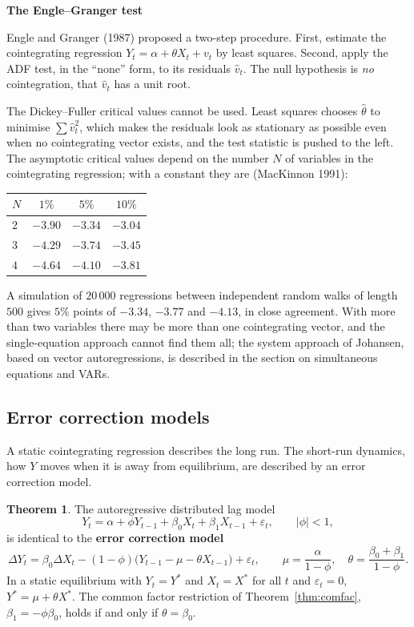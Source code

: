 \documentclass[11pt,a4paper]{article}
\numberwithin{equation}{section}
\theoremstyle{definition}
\newtheorem{thm}{Theorem}[subsection]
\newcommand{\subhead}[1]{%
  \par\medskip\noindent\textbf{#1}\par\nobreak\smallskip}
\begin{document}
\subhead{The Engle--Granger test}
Engle and Granger (1987) proposed a two-step procedure. First, estimate the cointegrating regression $Y_t = \alpha + \theta X_t + v_t$ by least squares. Second, apply
the ADF test, in the ``none'' form, to its residuals $\hat v_t$. The null hypothesis is \emph{no} cointegration, that $\hat v_t$ has a unit root.

The Dickey--Fuller critical values cannot be used. Least squares chooses $\hat\theta$ to minimise $\sum\hat v_t^2$, which makes the residuals look as stationary as
possible even when no cointegrating vector exists, and the test statistic is pushed to the left. The asymptotic critical values depend on the number
$N$ of variables in the cointegrating regression; with a constant they are (MacKinnon 1991):
\begin{center}
\renewcommand{\arraystretch}{1.3}
\begin{tabular}{lccc}
\hline
$N$ & $1\%$ & $5\%$ & $10\%$\\
\hline
$2$ & $-3.90$ & $-3.34$ & $-3.04$\\
$3$ & $-4.29$ & $-3.74$ & $-3.45$\\
$4$ & $-4.64$ & $-4.10$ & $-3.81$\\
\hline
\end{tabular}
\end{center}
A simulation of $20\,000$ regressions between independent random walks of length $500$ gives $5\%$ points of $-3.34$, $-3.77$ and $-4.13$, in close agreement.
With more than two variables there may be more than one cointegrating vector, and the single-equation approach cannot find them all; the system
approach of Johansen, based on vector autoregressions, is described in the section on simultaneous equations and VARs.

\subsection{Error correction models}
\label{ssec:ecm}

A static cointegrating regression describes the long run. The short-run dynamics, how $Y$ moves when it is away from equilibrium, are described by
an error correction model.

\begin{thm}
\label{thm:ecm}
The autoregressive distributed lag model
\[
Y_t = \alpha + \phi Y_{t-1} + \beta_0X_t + \beta_1X_{t-1} + \varepsilon_t, \qquad |\phi| < 1,
\]
is identical to the \textbf{error correction model}
\[
\Delta Y_t = \beta_0\Delta X_t - (1 - \phi)\bigl(Y_{t-1} - \mu - \theta X_{t-1}\bigr) + \varepsilon_t, \qquad
\mu = \frac{\alpha}{1 - \phi}, \quad \theta = \frac{\beta_0 + \beta_1}{1 - \phi} .
\]
In a static equilibrium with $Y_t = Y^*$ and $X_t = X^*$ for all $t$ and $\varepsilon_t = 0$, $Y^* = \mu + \theta X^*$. The common factor restriction of Theorem~\ref{thm:comfac}, $\beta_1 = -\phi\beta_0$,
holds if and only if $\theta = \beta_0$.
\end{thm}
\end{document}
